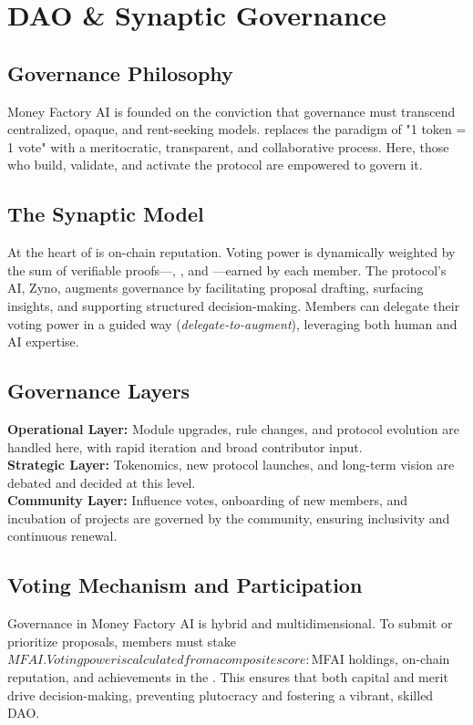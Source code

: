 
\section{DAO \& Synaptic Governance}

\subsection{Governance Philosophy}
Money Factory AI is founded on the conviction that governance must transcend centralized, opaque, and rent-seeking models.  replaces the paradigm of "1 token = 1 vote" with a meritocratic, transparent, and collaborative process. Here, those who build, validate, and activate the protocol are empowered to govern it.

\subsection{The Synaptic Model}
At the heart of  is on-chain reputation. Voting power is dynamically weighted by the sum of verifiable proofs—, , and —earned by each member. The protocol’s AI, Zyno, augments governance by facilitating proposal drafting, surfacing insights, and supporting structured decision-making. Members can delegate their voting power in a guided way (\textit{delegate-to-augment}), leveraging both human and AI expertise.

\subsection{Governance Layers}
\textbf{Operational Layer:} Module upgrades, rule changes, and protocol evolution are handled here, with rapid iteration and broad contributor input.\\
\textbf{Strategic Layer:} Tokenomics, new protocol launches, and long-term vision are debated and decided at this level.\\
\textbf{Community Layer:} Influence votes, onboarding of new members, and incubation of projects are governed by the community, ensuring inclusivity and continuous renewal.

\subsection{Voting Mechanism and Participation}
Governance in Money Factory AI is hybrid and multidimensional. To submit or prioritize proposals, members must stake $MFAI. Voting power is calculated from a composite score: $MFAI holdings, on-chain reputation, and achievements in the . This ensures that both capital and merit drive decision-making, preventing plutocracy and fostering a vibrant, skilled DAO.

